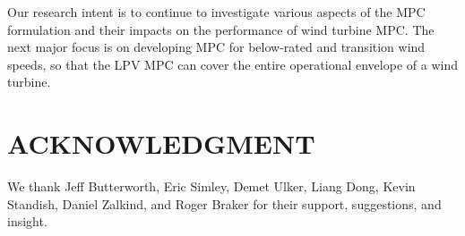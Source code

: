 \documentclass[letterpaper, 10 pt, conference]{ieeeconf}  %
\begin{document}
Our research intent is to continue to investigate various aspects of the MPC formulation and their impacts on the performance of wind turbine MPC. The next major focus is on developing MPC for below-rated and transition wind speeds, so that the LPV MPC can cover the entire operational envelope of a wind turbine.
   


\section*{ACKNOWLEDGMENT}

We thank Jeff Butterworth, Eric Simley, Demet Ulker, Liang Dong, Kevin Standish, Daniel Zalkind, and Roger Braker for their support, suggestions, and insight.




\end{document}
